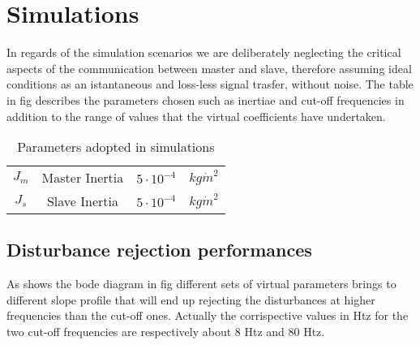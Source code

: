\section{Simulations}
In regards of the simulation scenarios we are deliberately neglecting the
critical aspects of the communication between master and slave, therefore
assuming ideal conditions as an istantaneous and loss-less signal trasfer,
without noise.
The table in fig describes the parameters chosen such as inertiae and
cut-off frequencies in addition to the range of values that the virtual
coefficients have undertaken.
\begin{table}[H]
\centering
	\begin{tabular}{c c c c}
		\toprule
		$J_{m}$  & Master Inertia & $5\cdot 10^{-4}$ & $kg\dot m^{2}$ \\
		$J_{s}$  & Slave Inertia & $5\cdot 10^{-4}$ & $kg\dot m^{2}$ \\
		\bottomrule
	\end{tabular}
	\caption{Parameters adopted in simulations}
	\label{simParams}
\end{table}

\subsection{Disturbance rejection performances}
As shows the bode diagram in fig different sets of virtual parameters
brings to different slope profile that will end up rejecting the
disturbances at higher frequencies than the cut-off ones.
Actually the corrispective values in Htz for the two cut-off frequencies are
respectively about 8 Htz and 80 Htz.

